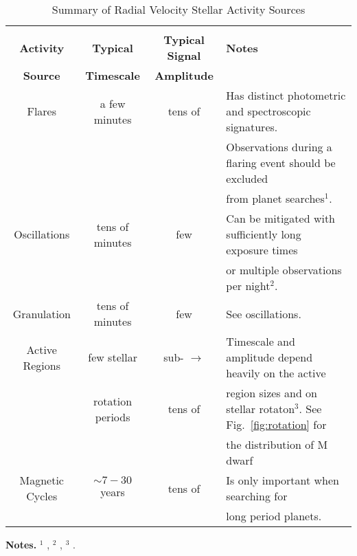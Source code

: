 \begin{table*}
\small
\renewcommand{\arraystretch}{0.7}
\caption[]{Summary of Radial Velocity Stellar Activity Sources}
\label{table:activity}
\begin{tabular}{cccl}
  \hline \\ [-1ex]
  \textbf{Activity} & \textbf{Typical} & \textbf{Typical Signal} & \textbf{Notes} \\
  \textbf{Source} & \textbf{Timescale} & \textbf{Amplitude} & \\
  \hline
  Flares & a few minutes & tens of \mps{} & Has distinct photometric and spectroscopic signatures. \\ 
  &&&Observations during a flaring event should be excluded \\
  &&& from planet searches$^1$. \\
  \hline
  Oscillations & tens of minutes & few \mps{} & Can be mitigated with sufficiently long exposure times \\
  &&&or multiple observations per night$^2$. \\
  \hline
  Granulation & tens of minutes & few \mps{} & See oscillations.  \\
  \hline
  Active Regions & few stellar & sub-\mps{} $\to$ & Timescale and amplitude depend heavily on the active \\
  & rotation periods & tens of \mps{} & region sizes and on stellar rotaton$^3$. See Fig.~\ref{fig:rotation} for \\
  &&& the distribution of M dwarf \prot{.} \\
  \hline
  Magnetic Cycles & $\sim  7-30$ years & tens of \mps{} & Is only important when searching for \\
  &&&long period planets.
  \end{tabular}
\begin{list}{}{}
\item {\bf{Notes.}}
      $^{1}$ \cite{reiners09}, $^2$ \cite{dumusque11a}, $^3$ \cite{dumusque11b}. \\
\end{list}
\end{table*}
